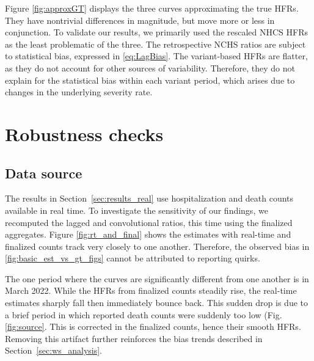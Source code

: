 \documentclass{article}
\begin{document}
Figure \ref{fig:approxGT} displays the three curves approximating the true HFRs. They have nontrivial differences in magnitude, but move more or less in conjunction. To validate our results, we primarily used the rescaled NHCS HFRs as the least problematic of the three. The retrospective NCHS ratios are subject to statistical bias, expressed in \eqref{eq:LagBias}. The variant-based HFRs are flatter, as they do not account for other sources of variability. Therefore, they do not explain for the statistical bias within each variant period, which arises due to changes in the underlying severity rate.  %

\section{Robustness checks}\label{apx:robustness}
\subsection{Data source}
The results in Section~\ref{sec:results_real} use hospitalization and death counts available in real time. To investigate the sensitivity of our findings, we recomputed the lagged and convolutional ratios, this time using the finalized aggregates. Figure \ref{fig:rt_and_final} shows the estimates with real-time and finalized counts track very closely to one another. Therefore, the observed bias in \ref{fig:basic_est_vs_gt_figs} cannot be attributed to reporting quirks.

The one period where the curves are significantly different from one another is in March 2022. While the HFRs from finalized counts steadily rise, the real-time estimates sharply fall then immediately bounce back. This sudden drop is due to a brief period in which reported death counts were suddenly too low (Fig. \ref{fig:source}. This is corrected in the finalized counts, hence their smooth HFRs. Removing this artifact further reinforces the bias trends described in Section~\ref{sec:ws_analysis}.
\end{document}
